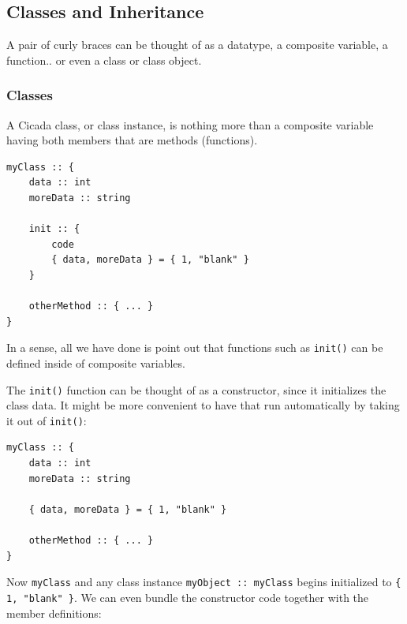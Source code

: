 \documentclass{article}
\newenvironment{code}{
       \begin{list}{}{
               \setlength{\leftmargin}{.4in}
               \setlength{\rightmargin}{0in}
               \setlength{\topsep}{.2in}
       }
       \small
       \item[] }
       { \end{list}   }
\begin{document}
\subsection{Classes and Inheritance}

A pair of curly braces can be thought of as a datatype, a composite variable, a function.. or even a class or class object.







\subsubsection{Classes}

A Cicada class, or class instance, is nothing more than a composite variable having both members that are methods (functions).

\begin{code} \begin{verbatim}
myClass :: {
    data :: int
    moreData :: string
    
    init :: {
        code
        { data, moreData } = { 1, "blank" }
    }
    
    otherMethod :: { ... }
}
\end{verbatim} \end{code}

\noindent In a sense, all we have done is point out that functions such as \verb#init()# can be defined inside of composite variables.

The \verb#init()# function can be thought of as a constructor, since it initializes the class data.  It might be more convenient to have that run automatically by taking it out of \verb#init()#:

\begin{code} \begin{verbatim}
myClass :: {
    data :: int
    moreData :: string
    
    { data, moreData } = { 1, "blank" }
    
    otherMethod :: { ... }
}
\end{verbatim} \end{code}

\noindent Now \verb#myClass# and any class instance \verb#myObject :: myClass# begins initialized to \verb${ 1, "blank" }$.  We can even bundle the constructor code together with the member definitions:
\end{document}

